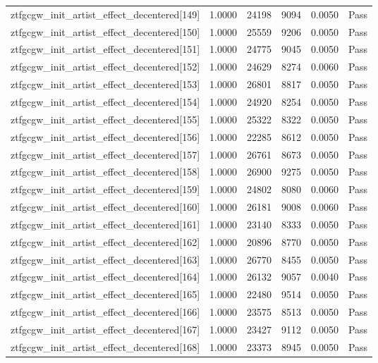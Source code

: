 \begin{table}[htbp]
\begin{tabular}{llrrll}
ztfgcgw\_init\_artist\_effect\_decentered[149] & 1.0000 & 24198 & 9094 & 0.0050 & Pass \\
ztfgcgw\_init\_artist\_effect\_decentered[150] & 1.0000 & 25559 & 9206 & 0.0050 & Pass \\
ztfgcgw\_init\_artist\_effect\_decentered[151] & 1.0000 & 24775 & 9045 & 0.0050 & Pass \\
ztfgcgw\_init\_artist\_effect\_decentered[152] & 1.0000 & 24629 & 8274 & 0.0060 & Pass \\
ztfgcgw\_init\_artist\_effect\_decentered[153] & 1.0000 & 26801 & 8817 & 0.0050 & Pass \\
ztfgcgw\_init\_artist\_effect\_decentered[154] & 1.0000 & 24920 & 8254 & 0.0050 & Pass \\
ztfgcgw\_init\_artist\_effect\_decentered[155] & 1.0000 & 25322 & 8322 & 0.0050 & Pass \\
ztfgcgw\_init\_artist\_effect\_decentered[156] & 1.0000 & 22285 & 8612 & 0.0050 & Pass \\
ztfgcgw\_init\_artist\_effect\_decentered[157] & 1.0000 & 26761 & 8673 & 0.0050 & Pass \\
ztfgcgw\_init\_artist\_effect\_decentered[158] & 1.0000 & 26900 & 9275 & 0.0050 & Pass \\
ztfgcgw\_init\_artist\_effect\_decentered[159] & 1.0000 & 24802 & 8080 & 0.0060 & Pass \\
ztfgcgw\_init\_artist\_effect\_decentered[160] & 1.0000 & 26181 & 9008 & 0.0060 & Pass \\
ztfgcgw\_init\_artist\_effect\_decentered[161] & 1.0000 & 23140 & 8333 & 0.0050 & Pass \\
ztfgcgw\_init\_artist\_effect\_decentered[162] & 1.0000 & 20896 & 8770 & 0.0050 & Pass \\
ztfgcgw\_init\_artist\_effect\_decentered[163] & 1.0000 & 26770 & 8455 & 0.0050 & Pass \\
ztfgcgw\_init\_artist\_effect\_decentered[164] & 1.0000 & 26132 & 9057 & 0.0040 & Pass \\
ztfgcgw\_init\_artist\_effect\_decentered[165] & 1.0000 & 22480 & 9514 & 0.0050 & Pass \\
ztfgcgw\_init\_artist\_effect\_decentered[166] & 1.0000 & 23575 & 8513 & 0.0050 & Pass \\
ztfgcgw\_init\_artist\_effect\_decentered[167] & 1.0000 & 23427 & 9112 & 0.0050 & Pass \\
ztfgcgw\_init\_artist\_effect\_decentered[168] & 1.0000 & 23373 & 8945 & 0.0050 & Pass \\

\end{tabular}
\end{table}
